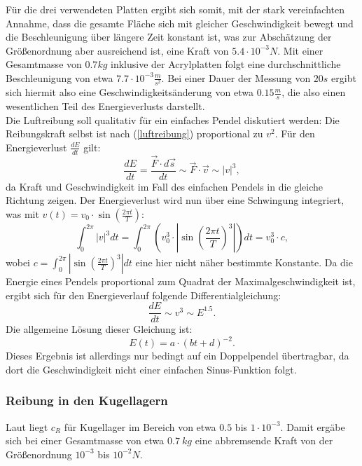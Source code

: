 Für die drei verwendeten Platten ergibt sich somit, mit der stark vereinfachten Annahme, dass die gesamte Fläche sich mit gleicher Geschwindigkeit bewegt und die Beschleunigung über längere Zeit konstant ist, was zur Abschätzung der Größenordnung aber ausreichend ist, eine Kraft von $ 5.4 \cdot 10^{-3}  N $. Mit einer Gesamtmasse von $0.7 kg$ inklusive der Acrylplatten folgt eine durchschnittliche Beschleunigung von etwa $ 7.7 \cdot 10^{-3} \frac{m}{s^2} $. Bei einer Dauer der Messung von $20 s$ ergibt sich hiermit also  eine Geschwindigkeitsänderung von etwa $ 0.15 \frac{m}{s} $, die also einen wesentlichen Teil des Energieverlusts darstellt. \\
Die Luftreibung soll qualitativ für ein einfaches Pendel diskutiert werden: Die Reibungskraft selbst ist nach (\ref{luftreibung}) proportional zu $v^2$. Für den Energieverlust $\frac{dE}{dt}$ gilt:
\begin{equation}
\frac{d E}{d t} = \frac{\vec{F} \cdot d\vec{s}}{dt} \sim  \vec{F} \cdot \vec{v} \sim |v|^3, 
\end{equation}
da Kraft und Geschwindigkeit im Fall des einfachen Pendels in die gleiche Richtung zeigen. 
Der Energieverlust wird nun über eine Schwingung integriert, was mit $ v(t) = v_0 \cdot \sin(\frac{2 \pi t}{T})$:
\begin{equation}
\int _0^{2\pi} |v|^3 dt = \int _0^{2\pi}( v_0^3 \cdot |\sin(\frac{2 \pi t}{T})^3|)dt = v_0^3 \cdot c,
\end{equation}
wobei $ c = \int _0^{2\pi} |\sin(\frac{2 \pi t}{T})^3|dt $ eine hier nicht näher bestimmte Konstante. 
Da die Energie eines Pendels proportional zum Quadrat der Maximalgeschwindigkeit ist, ergibt sich für den Energieverlauf folgende Differentialgleichung: 
\begin{equation}
\frac{dE}{dt} \sim v^3 \sim E^{1.5}. 
\end{equation}
Die allgemeine Lösung dieser Gleichung ist: 
\begin{equation}
E(t) = a \cdot (bt + d)^{-2}. 
\end{equation}
Dieses Ergebnis ist allerdings nur bedingt auf ein Doppelpendel übertragbar, da dort die Geschwindigkeit nicht einer einfachen Sinus-Funktion folgt. 

\subsubsection{Reibung in den Kugellagern}
Laut \cite{wiki} liegt $ c_R $ für Kugellager im Bereich von etwa 
$ 0.5 $ bis $ 1 \cdot 10^{-3} $. 
Damit ergäbe sich bei einer Gesamtmasse von etwa $ 0.7 \  kg  $ eine abbremsende Kraft von der Größenordnung $ 10^{-3} $ bis $ 10^{-2} N $. 

